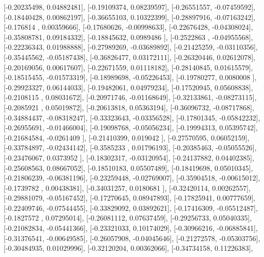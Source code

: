 \documentclass{article}
\begin{document}
       [-0.20235498,  0.04882481],
       [-0.19109374,  0.08239597],
       [-0.26551557, -0.07459592],
       [-0.18440428,  0.00862197],
       [-0.36655103,  0.10322399],
       [-0.28897916, -0.07163242],
       [-0.176814  ,  0.00359666],
       [-0.17680626, -0.00998633],
       [-0.22676428, -0.04308024],
       [-0.35808781,  0.09184332],
       [-0.18845632,  0.0989486 ],
       [-0.2522863 , -0.04955568],
       [-0.22236343,  0.01988888],
       [-0.27989269, -0.03689892],
       [-0.21425259, -0.03110356],
       [-0.35445562, -0.05187438],
       [-0.36826477,  0.03172111],
       [-0.26320446,  0.02612078],
       [-0.20169056,  0.00617607],
       [-0.22671559,  0.01118182],
       [-0.28140845,  0.01615579],
       [-0.18515455, -0.01573319],
       [-0.18989698, -0.05226453],
       [-0.19780277,  0.0080008 ],
       [-0.29923327,  0.06144033],
       [-0.19482061,  0.04979234],
       [-0.17520945,  0.05608838],
       [-0.2108115 ,  0.08031672],
       [-0.20971746, -0.01168649],
       [-0.32133861, -0.08273115],
       [-0.2085921 ,  0.05019872],
       [-0.20613818,  0.05363194],
       [-0.36096732, -0.08717868],
       [-0.34884437, -0.08318247],
       [-0.33323643, -0.03356528],
       [-0.17801345, -0.05842232],
       [-0.26955691, -0.01466004],
       [-0.19098768, -0.05056234],
       [-0.19994313,  0.05395742],
       [-0.21684584, -0.0261409 ],
       [-0.21410399,  0.019042  ],
       [-0.27570595,  0.06052159],
       [-0.33784897, -0.02434142],
       [-0.3585233 ,  0.01796193],
       [-0.20385463, -0.05055526],
       [-0.23476067,  0.0373952 ],
       [-0.18302317, -0.03120954],
       [-0.24137882,  0.04402385],
       [-0.25608563,  0.08667052],
       [-0.18510183,  0.05507489],
       [-0.18419698,  0.05010345],
       [-0.21806239, -0.06381196],
       [-0.23259448, -0.02769007],
       [-0.35904518, -0.00615012],
       [-0.1739782 ,  0.00438381],
       [-0.34031257,  0.0180681 ],
       [-0.32420114,  0.00262557],
       [-0.29881079, -0.05167452],
       [-0.17270645,  0.08947893],
       [-0.17825941,  0.00777659],
       [-0.22409746, -0.07544455],
       [-0.33829092,  0.03892621],
       [-0.17416309, -0.05512487],
       [-0.1827572 ,  0.07295014],
       [-0.26081112,  0.07637459],
       [-0.29256733,  0.05040335],
       [-0.21082834, -0.05441366],
       [-0.23321033,  0.10174029],
       [-0.30966216, -0.06885841],
       [-0.31376541, -0.00649585],
       [-0.26057908, -0.04045646],
       [-0.21272578, -0.05303756],
       [-0.30484935,  0.01029996],
       [-0.32120204,  0.00362066],
       [-0.34734158,  0.11226383],
\end{document}
